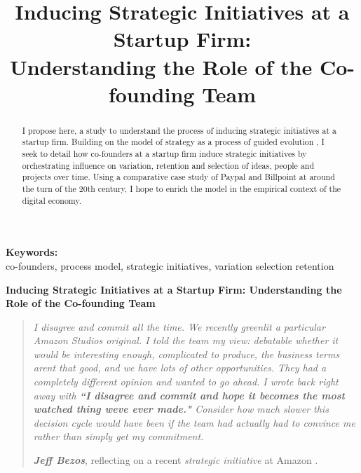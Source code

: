 \documentclass[12pt,letterpaper]{article}
\begin{document}
\title{Inducing Strategic Initiatives at a Startup Firm:\\Understanding the Role of the Co-founding Team}
\date{}
\maketitle

\begin{abstract} 
\normalsize I propose here, a study to understand the process of inducing strategic initiatives at a startup firm. Building on the model of strategy as a process of guided evolution \citep{Lovas2000}, I seek to detail how co-founders at a startup firm induce strategic initiatives by orchestrating influence on variation, retention and selection of ideas, people and projects over time. Using a comparative case study of Paypal and Billpoint at around the turn of the 20th century, I hope to enrich the \cite{Lovas2000} model in the empirical context of the digital economy.
\end{abstract}


{\textbf{Keywords:} \\\indent co-founders, process model, strategic initiatives, variation selection retention}

\newpage
\pagestyle{fancy}
\fancyhf{}
\rhead{\thepage}

\begin{center}
\textbf{Inducing Strategic Initiatives at a Startup Firm: Understanding the Role of the Co-founding Team}\vspace{1cm}
\end{center}

\begin{quotation}
\textit{I disagree and commit all the time. We recently greenlit a particular Amazon Studios original. I told the team my view: debatable whether it would be interesting enough, complicated to produce, the business terms aren\textquotesingle t that good, and we have lots of other opportunities. They had a completely different opinion and wanted to go ahead. I wrote back right away with \textbf{``I disagree and commit and hope it becomes the most watched thing we\textquotesingle ve ever made."} Consider how much slower this decision cycle would have been if the team had actually had to convince me rather than simply get my commitment.}\par
\null\hfill \textbf{\textit{Jeff Bezos}}, reflecting on a recent \textit{strategic initiative} at Amazon \citep{Bezos2016}.
\end{quotation}
\end{document}

